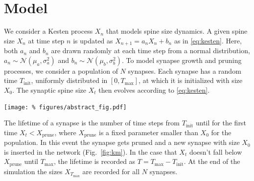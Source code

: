 
\section*{Model}
\vspace{-0.2cm}

We consider a Kesten process $X_n$ that models spine size dynamics. A given spine size $X_n$ at time step $n$ is updated as $X_{n+1} = a_n X_n + b_n$ as in \eqref{eq:kesten}. Here, both $a_n$ and $b_n$ are drawn randomly at each time step from a normal distribution, $a_n \sim \mathcal{N}(\mu_a, \sigma_a^2)$ and $b_n \sim \mathcal{N}(\mu_b, \sigma_b^2)$. To model synapse growth and pruning processes, we consider a population of $N$ synapses. Each synapse has a random time $T_{\mathrm{init}}$, uniformly distributed in $[0,T_{\text{max}}]$, at which it is initialized with size $X_0$. The synaptic spine size $X_t$ then evolves according to \eqref{eq:kesten}.

\begin{minipage}{\columnwidth}
  \begin{center}
    \vspace{0.75cm}
  \texttt{[image: \%
    figures/abstract\_fig.pdf]}
  \label{fig:km}
\end{center}
\end{minipage}

\columnbreak
The lifetime of a synapse is the number of time steps from $T_{\text{init}}$ until for the first time $X_t < X_{\mathrm{prune}}$, where $X_{\mathrm{prune}}$ is a fixed parameter smaller than $X_0$ for the population. In this event the synapse gets pruned and a new synapse with size $X_0$ is inserted in the network (Fig.~\ref{fig:km}). In the case that $X_t$ doesn't fall below $X_{\mathrm{prune}}$ until $T_{\text{max}}$, the lifetime is recorded as $T=T_{\text{max}}-T_{\text{init}}$. At the end of the simulation the sizes $X_{T_{\text{max}}}$ are recorded for all $N$ synapses.


